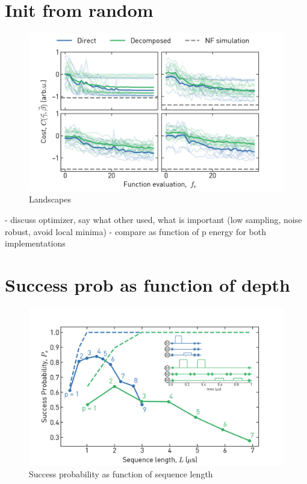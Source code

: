 \section{Init from random}
\begin{figure}[ht]
    \centering
    \includegraphics[width=\textwidth]{chapters/qaoa/figs/ch5_qaoa_optimization_traces_20200116_165916.png}
    \caption{Landscapes}
    \label{fig:qaoa_optimization_traces}
\end{figure}
- discuss optimizer, say what other used, what is important (low sampling, noise robust, avoid local minima)
- compare as function of p energy for both implementations

\section{Success prob as function of depth}


\begin{figure}[ht]
    \centering
    \includegraphics[width=\textwidth]{chapters/qaoa/figs/ch5_qaoa_sequence_lengths_v1_withinset_20200202_120000.png}
    \caption{Success probability as function of sequence length}
    \label{fig:qaoa_sequence_lengths}
\end{figure}

